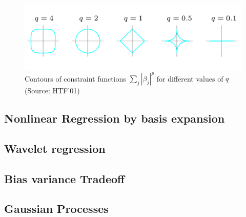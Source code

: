 \documentclass[MachineLearning]{subfiles}
\begin{document}
\begin{figure}[H]
\includegraphics[width=\linewidth]{figs/different-strengths-of-shrinkage}
\caption{Contours of constraint functions \(\sum_{j}|\beta_j|^p\) for different values of \(q\) (Source: HTF'01)}
\end{figure}

\subsection{Nonlinear Regression by basis expansion}
\subsection{Wavelet regression}
\subsection{Bias variance Tradeoff}
\subsection{Gaussian Processes}
\end{document}
